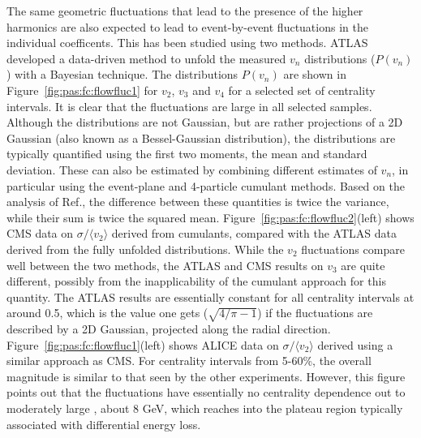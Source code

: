 The same geometric fluctuations that lead to the presence of the higher harmonics are also expected to lead to 
event-by-event fluctuations in the individual coefficents.  This has been studied using two methods.
ATLAS developed a data-driven method to unfold the measured $v_n$ distributions ($P(v_n)$) with a Bayesian 
technique.  The distributions $P(v_n)$ are shown in Figure~\ref{fig:pas:fc:flowfluc1} for $v_2$, $v_3$ and $v_4$
for a selected set of centrality intervals.  It is clear that the fluctuations are large in all selected samples.
Although the distributions are not Gaussian, but are rather projections of a 2D Gaussian (also known as a
Bessel-Gaussian distribution),
the distributions are typically quantified using the first two moments, the mean and standard deviation.
These can also be estimated by combining different estimates of $v_n$, in particular using the event-plane 
and 4-particle cumulant methods.  Based on the analysis of Ref.{}, 
the difference between these quantities is twice the variance, while their sum is twice the squared mean.
Figure~\ref{fig:pas:fc:flowfluc2}(left) shows CMS data on $\sigma/\langle v_2 \rangle$ derived 
from cumulants, compared with the ATLAS data derived from the fully unfolded distributions.
While the $v_2$ fluctuations compare well between the two methods, the ATLAS and CMS results on $v_3$
are quite different, possibly from the inapplicability of the cumulant approach for this quantity.
The ATLAS results are essentially constant for all centrality intervals at around 0.5, which is the 
value one gets ($\sqrt{4/\pi-1}$) if the fluctuations are described by a 2D Gaussian, 
projected along the radial direction.
Figure~\ref{fig:pas:fc:flowfluc1}(left) shows ALICE data on $\sigma/\langle v_2 \rangle$ derived 
using a similar approach as CMS.  For centrality intervals from 5-60\%, the overall magnitude
is similar to that seen by the other experiments.  However, this figure points out that the fluctuations
have essentially no centrality dependence out to moderately large \pT, about 8 GeV, which reaches into 
the plateau region typically associated with differential energy loss.





